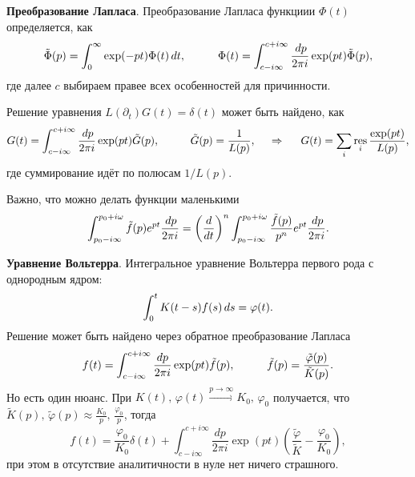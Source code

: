 


\textbf{Преобразование Лапласа}. Преобразование Лапласа функциии $\Phi(t)$ определяется, как
\begin{equation*}
    \tilde{\Phi}(p) = \int_{0}^{\infty}  \exp(-pt) \Phi(t) \d t,
    \hspace{10 mm} 
    \Phi(t) = \int_{c-i \infty}^{c+i \infty} \frac{\d p}{2 \pi i} \exp(pt) \tilde{\Phi}(p),
\end{equation*}
где далее $c$ выбираем правее всех особенностей для причинности. 

Решение уравнения $L(\partial_t) G(t) = \delta(t)$ может быть найдено, как
\begin{equation*}
    G(t) = \int_{c-i \infty}^{c+i \infty} \frac{\d p}{2 \pi i} \exp(p t) \tilde{G}(p),
    \hspace{10 mm} \tilde{G} (p) = \frac{1}{L(p)},
    \hspace{0.5cm} \Rightarrow \hspace{0.5cm}
    G(t) = \sum_i \res_i \frac{\exp(pt)}{L(p)},
\end{equation*}
где суммирование идёт по полюсам $1/L(p)$. 

Важно, что можно делать функции маленькими
\begin{equation}
    \int_{p_0 - i \infty}^{p_0 + i \omega} \tilde{f}(p) e^{pt} \frac{\, d p}{2 \pi i} = 
    \left(\frac{d }{d t} \right)^n \int_{p_0 - i \infty}^{p_0 + i \omega} \frac{\tilde{f}(p)}{p^n} e^{pt} \frac{\, d p}{2 \pi i}.
\end{equation}




\textbf{Уравнение Вольтерра}. Интегральное уравнение Вольтерра первого рода с однородным ядром:
\begin{equation*}
    \int_{0}^{t}  K(t-s) f(s) \, d s = \varphi(t).
\end{equation*}
Решение может быть найдено через обратное преобразование Лапласа
\begin{equation*}
    f(t) = \int_{c-i \infty}^{c+i \infty} \frac{d p}{2 \pi i} \exp(pt) \tilde{f}(p),
    \hspace{10 mm} 
    \tilde{f}(p) = \frac{\tilde{\varphi}(p)}{\tilde{K}(p)}.
\end{equation*}
Но есть один нюанс. При $K(t),\, \varphi(t) \overset{p \to \infty}{\to} K_0,\, \varphi_0$ получается, что $\tilde{K}(p),\, \tilde{\varphi}(p) \approx \frac{K_0}{p},\, \frac{\varphi_0}{p}$, тогда
\begin{equation*}
    f(t) = \frac{\varphi_0}{K_0} \delta(t) + \int_{c-i \infty}^{c+i \infty} \frac{d p}{2 \pi i} \exp(p t)
    \left(
        \frac{\tilde{\varphi}}{\tilde{K}} - \frac{\varphi_0}{K_0}
    \right),
\end{equation*}
при этом в отсутствие аналитичности в нуле нет ничего страшного. 


